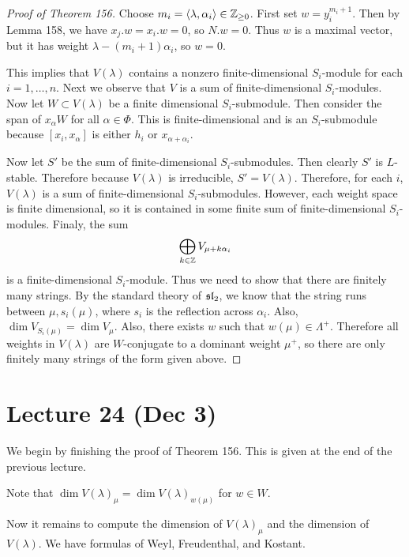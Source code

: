 \documentclass[twoside, 10pt]{article}
\begin{document}
    \begin{proof}[Proof of Theorem 156]
        Choose $m_i = \langle\lambda, \alpha_i\rangle \in \mathbb{Z}_{\geq 0}$. First set $w = y_i^{m_i+1}$. Then by Lemma 158, we have $x_j.w = x_i.w = 0$, so $N.w = 0$. Thus $w$ is a maximal vector, but it has weight $\lambda - (m_i+1)\alpha_i$, so $w = 0$.

        This implies that $V(\lambda)$ contains a nonzero finite-dimensional $S_i$-module for each $i = 1, \ldots, n$. Next we observe that $V$ is a sum of finite-dimensional $S_i$-modules. Now let $W \subset V(\lambda)$ be a finite dimensional $S_i$-submodule. Then consider the span of $x_{\alpha}W$ for all $\alpha \in \Phi$. This is finite-dimensional and is an $S_i$-submodule because $[x_i, x_{\alpha}]$ is either $h_i$ or $x_{\alpha+\alpha_i}$.

        Now let $S'$ be the sum of finite-dimensional $S_i$-submodules. Then clearly $S'$ is $L$-stable. Therefore because $V(\lambda)$ is irreducible, $S' = V(\lambda)$. Therefore, for each $i$, $V(\lambda)$ is a sum of finite-dimensional $S_i$-submodules. However, each weight space is finite dimensional, so it is contained in some finite sum of finite-dimensional $S_i$-modules. Finaly, the sum
        \[ \bigoplus_{k \in \mathbb{Z}} V_{\mu + k\alpha_i} \] 
        is a finite-dimensional $S_i$-module. Thus we need to show that there are finitely many strings. By the standard theory of $\mathfrak{sl}_2$, we know that the string runs between $\mu, s_i(\mu)$, where $s_i$ is the reflection across $\alpha_i$. Also, $\dim V_{S_i(\mu)} = \dim V_{\mu}$. Also, there exists $w$ such that $w(\mu) \in \Lambda^+$. Therefore all weights in $V(\lambda)$ are $W$-conjugate to a dominant weight $\mu^+$, so there are only finitely many strings of the form given above.
    \end{proof}

    \section{Lecture 24 (Dec 3)}%
    \label{sec:lecture_24_dec_3_}

    We begin by finishing the proof of Theorem 156. This is given at the end of the previous lecture.

    \begin{cor}
        Note that $\dim V(\lambda)_{\mu} = \dim V(\lambda)_{w(\mu)}$ for $w \in W$.
    \end{cor}

    Now it remains to compute the dimension of $V(\lambda)_{\mu}$ and the dimension of $V(\lambda)$. We have formulas of Weyl, Freudenthal, and Kostant.
\end{document}
